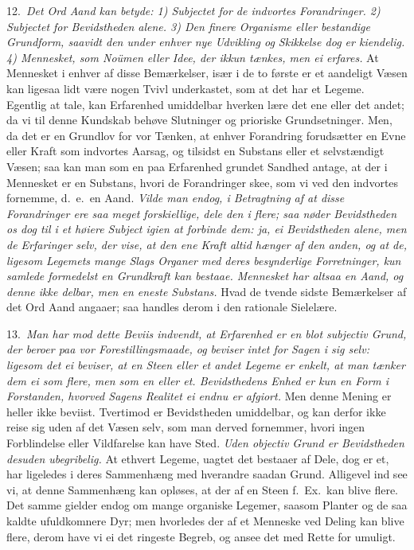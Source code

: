 \documentclass[12pt,a4paper]{article}
\newcommand{\opage}[1]{\marginnote{\footnotesize\textit{[#1]}}}
\begin{document}
12.~\emph{Det Ord Aand kan betyde: 1) Subjectet for de indvortes Forandringer.
2) Subjectet for Bevidstheden alene. 3) Den finere Organisme eller bestandige
Grundform, saavidt den under enhver nye Udvikling og Skikkelse dog er kiendelig.
4) Mennesket, som Noümen eller Idee, der ikkun tænkes, men ei erfares.} At
Mennesket i enhver af disse Bemærkelser, især i de to første er et aandeligt
Væsen kan ligesaa lidt være nogen Tvivl underkastet, som at det har et Legeme.
Egentlig at tale, kan Erfarenhed umiddelbar hverken lære det ene eller det andet;
da vi til denne Kundskab behøve Slutninger og prioriske Grundsetninger. Men, da
det er en Grundlov for vor Tænken, at enhver Forandring forudsætter en Evne eller
Kraft som indvortes Aarsag, og tilsidst en Substans eller et selvstændigt Væsen;
saa kan man som en paa Erfarenhed grundet Sandhed antage, at der i Mennesket er
en Substans, hvori de Forandringer skee, som vi ved den indvortes fornemme,
d.~e.\ en Aand. \emph{Vilde man endog, i Betragtning af at disse Forandringer ere
saa
\opage{24} meget forskiellige, dele den i flere; saa nøder Bevidstheden os dog til i et
høiere Subject igien at forbinde dem: ja, ei Bevidstheden alene, men de Erfaringer
selv, der vise, at den ene Kraft altid hænger af den anden, og at de, ligesom
Legemets mange Slags Organer med deres besynderlige Forretninger, kun samlede
formedelst en Grundkraft kan bestaae. Mennesket har altsaa en Aand, og denne ikke
delbar, men en eneste Substans.} Hvad de tvende sidste Bemærkelser af det Ord Aand
angaaer; saa handles derom i den rationale Sielelære.

13.~\emph{Man har mod dette Beviis indvendt, at Erfarenhed er en blot subjectiv
Grund, der beroer paa vor Forestillingsmaade, og beviser intet for Sagen i sig
selv: ligesom det ei beviser, at en Steen eller et andet Legeme er enkelt, at man
tænker dem ei som flere, men som en eller et. Bevidsthedens Enhed er kun en Form i
Forstanden, hvorved Sagens Realitet ei endnu er afgiort.} Men denne Mening er
heller ikke beviist. Tvertimod er Bevidstheden umiddelbar, og kan derfor ikke
reise sig uden af det Væsen selv, som man derved fornemmer, hvori ingen
Forblindelse eller Vildfarelse kan have Sted. \emph{Uden objectiv Grund er
Bevidstheden desuden ubegribelig.} At ethvert Legeme, uagtet det bestaaer af Dele,
dog er et, har ligeledes i deres Sammenhæng med hverandre saadan Grund. Alligevel
ind%
\opage{25}see vi, at denne Sammenhæng kan opløses, at der af en Steen f.~Ex.\ kan blive
flere. Det samme gielder endog om mange organiske Legemer, saasom Planter og de
saa kaldte ufuldkomnere Dyr; men hvorledes der af et Menneske ved Deling kan blive
flere, derom have vi ei det ringeste Begreb, og ansee det med Rette for umuligt.
\end{document}
